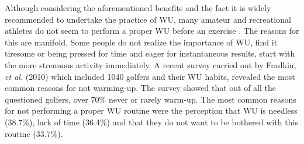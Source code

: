 Although considering the aforementioned benefits and the fact it is widely recommended to undertake the practice of WU, many amateur and recreational athletes do not seem to perform a proper WU before an exercise \cite{fradkin2010effects}. The reasons for this are manifold. Some people do not realize the importance of WU, find it tiresome or being pressed for time and eager for instantaneous results, start with the more strenuous activity immediately. A recent survey carried out by Fradkin, \textit{et al.} (2010) which included 1040 golfers and their WU habits, revealed the most common reasons for not warming-up. The survey showed that out of all the questioned golfers, over 70\% never or rarely warm-up. The most common reasons for not performing a proper WU routine were the perception that WU is needless (38.7\%), lack of time (36.4\%) and that they do not want to be bothered with this routine (33.7\%).

